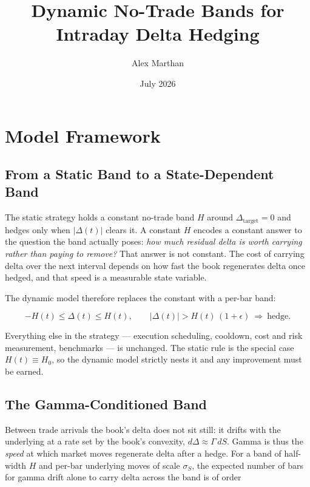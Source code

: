 \documentclass{article}
\title{Dynamic No-Trade Bands for Intraday Delta Hedging}
\author{Alex Marthan}
\date{July 2026}
\begin{document}
\maketitle

\section{Model Framework}

\subsection{From a Static Band to a State-Dependent Band}

The static strategy holds a constant no-trade band $H$ around
$\Delta_{\text{target}} = 0$ and hedges only when $\lvert\Delta(t)\rvert$ clears it. A
constant $H$ encodes a constant answer to the question the band actually poses: \emph{how
much residual delta is worth carrying rather than paying to remove?} That answer is not
constant. The cost of carrying delta over the next interval depends on how fast the book
regenerates delta once hedged, and that speed is a measurable state variable.

The dynamic model therefore replaces the constant with a per-bar band:

\begin{eqbox}
\begin{equation}
-H(t) \le \Delta(t) \le H(t),
\qquad
\lvert \Delta(t) \rvert > H(t)\,(1+\epsilon)
\ \Rightarrow\ \text{hedge}.
\label{eq:dyntrigger}
\end{equation}
\end{eqbox}

Everything else in the strategy --- execution scheduling, cooldown, cost and risk
measurement, benchmarks --- is unchanged. The static rule is the special case
$H(t) \equiv H_0$, so the dynamic model strictly nests it and any improvement must be
earned.

\subsection{The Gamma-Conditioned Band}

Between trade arrivals the book's delta does not sit still: it drifts with the underlying
at a rate set by the book's convexity, $d\Delta \approx \Gamma\,dS$. Gamma is thus the
\emph{speed} at which market moves regenerate delta after a hedge. For a band of
half-width $H$ and per-bar underlying moves of scale $\sigma_S$, the expected number of
bars for gamma drift alone to carry delta across the band is of order
\end{document}
